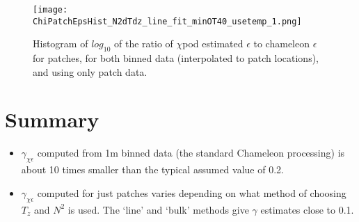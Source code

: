 \documentclass[11pt]{article}
\begin{document}
\begin{figure}[htbp]
\texttt{[image: ChiPatchEpsHist\_N2dTdz\_line\_fit\_minOT40\_usetemp\_1.png]}
\caption{Histogram of $log_{10}$ of the ratio of $\chi$pod estimated $\epsilon$ to chameleon $\epsilon$ for patches, for both binned data (interpolated to patch locations), and using only patch data.}
\label{epscomphist}
\end{figure}





\clearpage
\section{Summary}

\begin{itemize}
\item $\gamma_{\chi\epsilon}$ computed from 1m binned data (the standard Chameleon processing) is about 10 times smaller than the typical assumed value of 0.2.
\item $\gamma_{\chi\epsilon}$ computed for just patches varies depending on what method of choosing $T_z$ and $N^2$ is used. The `line' and `bulk' methods give $\gamma$ estimates close to 0.1. 
\end{itemize}
\end{document}
